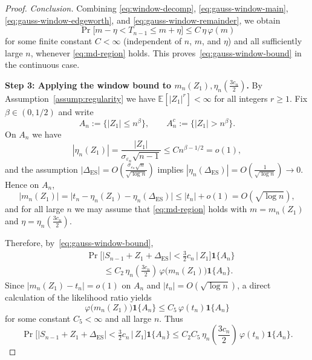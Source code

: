 \documentclass{article}
\theoremstyle{plain}
\theoremstyle{definition}
\begin{document}
\begin{proof}
\medskip\noindent
\textit{Conclusion.}
Combining
\eqref{eq:window-decomp},
\eqref{eq:gauss-window-main},
\eqref{eq:gauss-window-edgeworth},
and \eqref{eq:gauss-window-remainder}, we obtain
\[
  \Pr\bigl[m-\eta < T_{n-1} \le m+\eta\bigr]
  \le C\,\eta\,\varphi(m)
\]
for some finite constant $C<\infty$ (independent of $n$, $m$, and $\eta$)
and all sufficiently large $n$, whenever \eqref{eq:md-region} holds.
This proves~\eqref{eq:gauss-window-bound} in the continuous case.





\medskip

\noindent
\textbf{Step 3: Applying the window bound to $m_n(Z_1),\eta_n\left(\frac{3 c_n}{2}\right)$.}
By Assumption~\ref{assump:regularity} we have
$\mathbb E[|Z_1|^r]<\infty$ for all integers $r\ge1$.
Fix $\beta\in(0,1/2)$ and write
\[
  A_n := \{|Z_1|\le n^\beta\},
  \qquad
  A_n^c := \{|Z_1|>n^\beta\}.
\]
On $A_n$ we have
\[
  |\eta_n(Z_1)|
  = \frac{|Z_1|}{\sigma_{\varepsilon_n}\sqrt{n-1}}
  \le C n^{\beta-1/2}
  = o(1),
\]
and the assumption $|\Delta_{\mathrm{ES}}|=O\left(\frac{\sigma_{\varepsilon_n}\sqrt{n}}{\sqrt{\log n}}\right)$ implies
$|\eta_n(\Delta_{\mathrm{ES}})|=O\left(\frac{1}{\sqrt{\log n}}\right)\to0$.
Hence on $A_n$,
\[
  |m_n(Z_1)|
  = \bigl|t_n-\eta_n(Z_1)-\eta_n(\Delta_{\mathrm{ES}})\bigr|
  \le |t_n|+o(1)
  = O(\sqrt{\log n}),
\]
and for all large $n$ we may assume that
\eqref{eq:md-region} holds with $m=m_n(Z_1)$ and
$\eta=\eta_n\left(\frac{3 c_n}{2}\right)$.

Therefore, by~\eqref{eq:gauss-window-bound},
\begin{align*}
  &\Pr\bigl[
    |S_{n-1} + Z_1 + \Delta_{\mathrm{ES}}|
    < \tfrac{3}{2}c_n
    \,\big|\,
    Z_1
  \bigr]\mathbf 1\{A_n\}
  \\
  &\qquad\le
  C_2\,\eta_n\left(\frac{3 c_n}{2}\right)\,\varphi\bigl(m_n(Z_1)\bigr)\mathbf 1\{A_n\}.
\end{align*}
Since $|m_n(Z_1)-t_n|=o(1)$ on $A_n$ and $|t_n|=O(\sqrt{\log n})$,
a direct calculation of the likelihood ratio yields
\[
  \varphi\bigl(m_n(Z_1)\bigr)\mathbf 1\{A_n\}
  \le C_5\,\varphi(t_n)\mathbf 1\{A_n\}
\]
for some constant $C_5<\infty$ and all large $n$.
Thus
\begin{equation}
  \label{eq:on-An}
  \Pr\bigl[
    |S_{n-1} + Z_1 + \Delta_{\mathrm{ES}}|
    < \tfrac{3}{2}c_n
    \,\big|\,
    Z_1
  \bigr]\mathbf 1\{A_n\}
  \le
  C_2C_5\,\eta_n\left(\frac{3 c_n}{2}\right)\,\varphi(t_n)\mathbf 1\{A_n\}.
\end{equation}


\end{proof}
\end{document}
